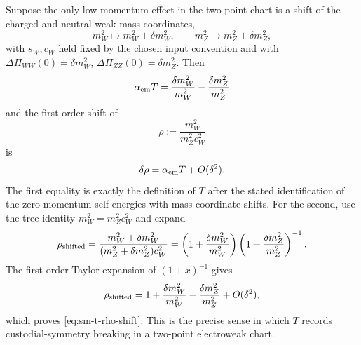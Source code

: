 \begin{remark}
\label{rem:sm-t-coordinate-rho}
Suppose the only low-momentum effect in the two-point chart is a shift of the
charged and neutral weak mass coordinates,
\[
  m_W^2\mapsto m_W^2+\delta m_W^2,
  \qquad
  m_Z^2\mapsto m_Z^2+\delta m_Z^2,
\]
with \(s_W,c_W\) held fixed by the chosen input convention and with
\(\Delta\Pi_{WW}(0)=\delta m_W^2\),
\(\Delta\Pi_{ZZ}(0)=\delta m_Z^2\).  Then
\begin{equation}
  \alpha_{\rm em}T
  =
  \frac{\delta m_W^2}{m_W^2}
  -
  \frac{\delta m_Z^2}{m_Z^2}
  \label{eq:sm-t-fractional-mass-shift}
\end{equation}
and the first-order shift of
\[
  \rho:=\frac{m_W^2}{m_Z^2c_W^2}
\]
is
\begin{equation}
  \delta\rho=\alpha_{\rm em}T+O(\delta^2).
  \label{eq:sm-t-rho-shift}
\end{equation}
The first equality is exactly the definition of \(T\) after the stated
identification of the zero-momentum self-energies with mass-coordinate shifts.
For the second, use the tree identity \(m_W^2=m_Z^2c_W^2\) and expand
\[
  \rho_{\rm shifted}
  =
  \frac{m_W^2+\delta m_W^2}
       {(m_Z^2+\delta m_Z^2)c_W^2}
  =
  \left(1+\frac{\delta m_W^2}{m_W^2}\right)
  \left(1+\frac{\delta m_Z^2}{m_Z^2}\right)^{-1}.
\]
The first-order Taylor expansion of \((1+x)^{-1}\) gives
\[
  \rho_{\rm shifted}
  =
  1+
  \frac{\delta m_W^2}{m_W^2}
  -
  \frac{\delta m_Z^2}{m_Z^2}
  +O(\delta^2),
\]
which proves \eqref{eq:sm-t-rho-shift}.  This is the precise sense in which
\(T\) records custodial-symmetry breaking in a two-point electroweak chart.
\end{remark}

